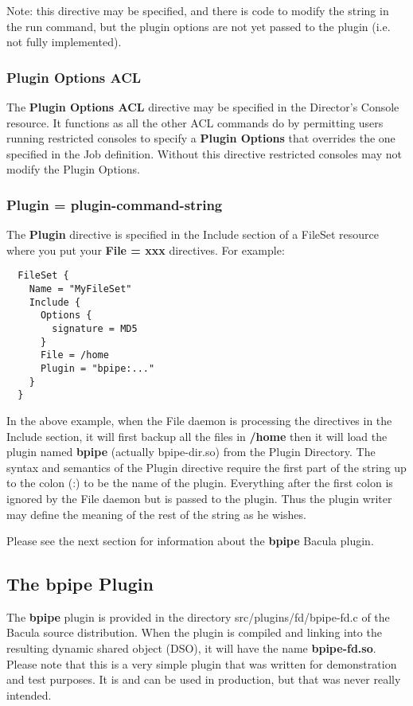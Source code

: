 Note: this directive may be specified, and there is code to modify
the string in the run command, but the plugin options are not yet passed to
the plugin (i.e. not fully implemented).

\subsubsection{Plugin Options ACL}
The {\bf Plugin Options ACL} directive may be specified in the
Director's Console resource. It functions as all the other ACL commands
do by permitting users running restricted consoles to specify a 
{\bf Plugin Options} that overrides the one specified in the Job
definition. Without this directive restricted consoles may not modify
the Plugin Options.

\subsubsection{Plugin = \lt{}plugin-command-string\gt{}}
The {\bf Plugin} directive is specified in the Include section of
a FileSet resource where you put your {\bf File = xxx} directives.
For example:

\begin{verbatim}
  FileSet {
    Name = "MyFileSet"
    Include {
      Options {
        signature = MD5
      }
      File = /home
      Plugin = "bpipe:..."
    }
  }
\end{verbatim}

In the above example, when the File daemon is processing the directives
in the Include section, it will first backup all the files in {\bf /home}
then it will load the plugin named {\bf bpipe} (actually bpipe-dir.so) from
the Plugin Directory.  The syntax and semantics of the Plugin directive
require the first part of the string up to the colon (:) to be the name
of the plugin. Everything after the first colon is ignored by the File daemon but
is passed to the plugin. Thus the plugin writer may define the meaning of the
rest of the string as he wishes.

Please see the next section for information about the {\bf bpipe} Bacula
plugin.

\subsection{The bpipe Plugin}
The {\bf bpipe} plugin is provided in the directory src/plugins/fd/bpipe-fd.c of
the Bacula source distribution. When the plugin is compiled and linking into
the resulting dynamic shared object (DSO), it will have the name {\bf bpipe-fd.so}.
Please note that this is a very simple plugin that was written for
demonstration and test purposes. It is and can be used in production, but
that was never really intended.

